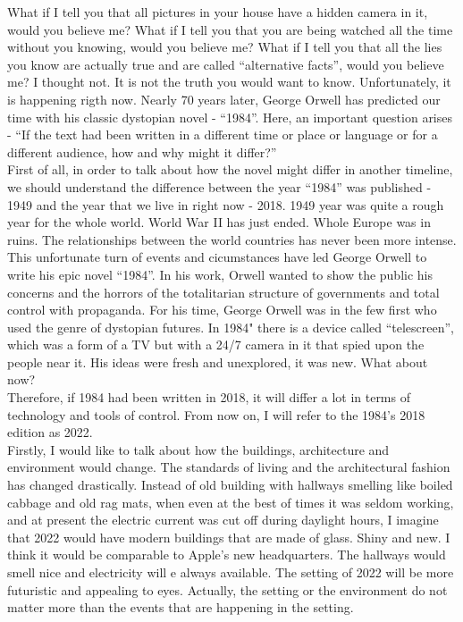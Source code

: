 \documentclass[a4paper,12pt]{article}
\begin{document}
What if I tell you that all pictures in your house have a hidden camera in it, would you believe me? What if I tell you that you are being watched all the time without you knowing, would you believe me?  What if I tell you that all the lies you know are actually true and are called ``alternative facts'', would you believe me? I thought not. It is not the truth you would want to know. Unfortunately, it is happening rigth now. Nearly 70 years later, George Orwell has predicted our time with his classic dystopian novel - ``1984''. Here, an important question arises - ``If the text had been written in a different time or place or language or for a different audience, how and why might it differ?'' \\


First of all, in order to talk about how the novel might differ in another timeline, we should understand the difference between the year ``1984'' was published - 1949 and the year that we live in right now - 2018. 1949 year was quite a rough year for the whole world. World War II has just ended. Whole Europe was in ruins. The relationships between the world countries has never been more intense. This unfortunate turn of events and cicumstances have led George Orwell to write his epic novel ``1984''. In his work, Orwell wanted to show the public his concerns and the horrors of the totalitarian structure of governments and total control with propaganda. For his time, George Orwell was in the few first who used the genre of dystopian futures. In 1984" there is a device called ``telescreen'', which was a form of a TV but with a 24/7 camera in it that spied upon the people near it. His ideas were fresh and unexplored, it was new. What about now?\\



Therefore, if 1984 had been written in 2018, it will differ a lot in terms of technology and tools of control. From now on, I will refer to the 1984's 2018 edition as 2022. \\


Firstly, I would like to talk about how the buildings, architecture and environment would change. The standards of living and the architectural fashion has changed drastically. Instead of old building with hallways smelling like boiled cabbage and old rag mats, when even at the best of times it was seldom working, and at present the electric current was cut off during daylight hours, I imagine that 2022 would have modern buildings that are made of glass. Shiny and new. I think it would be comparable to Apple's new headquarters.\cite{apple} The hallways would smell nice and electricity will e always available. The setting of 2022 will be more futuristic and appealing to eyes. Actually, the setting or the environment do not matter more than the events that are happening in the setting. \\
\end{document}
